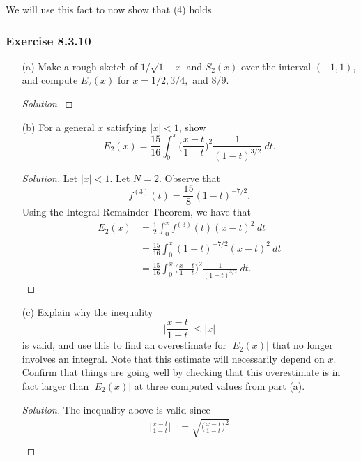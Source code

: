 We will use this fact to now show that (4) holds.

\subsubsection{Exercise 8.3.10} 
\begin{enumerate}
    \item[(a)] Make a rough sketch of \( 1 / \sqrt{ 1 -x  }  \) and \( S_{2}(x)  \) over the interval \( (-1,1)  \), and compute \( E_{2}(x)  \) for \( x = 1/2 , 3/4 ,  \) and \( 8/9  \).
        \begin{proof}[Solution]
        
        \end{proof}
    \item[(b)] For a general \( x  \) satisfying \(  |  x  |  < 1  \), show 
        \[  E_{2}(x) = \frac{ 15 }{ 16  }  \int_{ 0 }^{ x  }  \Big( \frac{ x - t  }{ 1 - t  }  \Big)^{2} \frac{ 1 }{ (1-t)^{3/2 } }  \ dt. \]
        \begin{proof}[Solution]
        Let \( |  x  |  < 1  \). Let \( N = 2  \). Observe that 
        \[  f^{(3)}(t) = \frac{ 15 }{ 8  }  (1- t )^{-7/2}.\] Using the Integral Remainder Theorem, we have that 
        \begin{align*}
            E_{2}(x) &= \frac{ 1 }{ 2 } \int_{ 0 }^{ x }  f^{(3)}(t) (x-t)^{2} \  dt   \\
                     &= \frac{ 15 }{ 16 } \int_{ 0 }^{ x }  (1-t)^{-7/2} (x - t )^{2} \  dt \\
                     &= \frac{ 15 }{ 16 }  \int_{ 0 }^{ x  }  \Big( \frac{ x - t  }{ 1 - t  }  \Big)^{2} \frac{ 1 }{ (1-t)^{3/2 } }  \  dt.
        \end{align*}
        \end{proof}
    \item[(c)] Explain why the inequality 
        \[  \Big| \frac{ x - t  }{ 1 -t  }  \Big|  \leq | x  |  \]
        is valid, and use this to find an overestimate for \( | E_{2}(x)  |   \) that no longer involves an integral. Note that this estimate will necessarily depend on \( x  \). Confirm that things are going well by checking that this overestimate is in fact larger than \( | E_{2}(x)  |  \) at three computed values from part (a).
        \begin{proof}[Solution]
        The inequality above is valid since 
        \begin{align*}
            \Big| \frac{ x - t  }{  1 - t  }  \Big|  &= \sqrt{  \Big( \frac{ x - t  }{ 1 - t  }  \Big)^{2}  }  \\

\end{align*}
\end{proof}
\end{enumerate}
